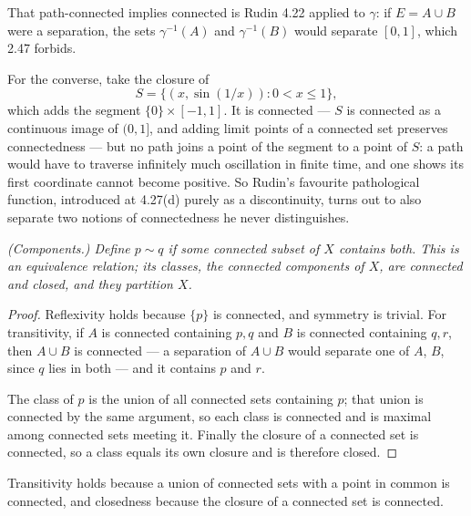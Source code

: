 \begin{deeper}
That path-connected implies connected is Rudin 4.22 applied to $\gamma$:
if $E = A \cup B$ were a separation, the sets $\gamma^{-1}(A)$ and
$\gamma^{-1}(B)$ would separate $[0,1]$, which 2.47 forbids.

For the converse, take the closure of
\[ S = \{(x,\sin(1/x)) : 0 < x \le 1\} , \]
which adds the segment $\{0\}\times[-1,1]$. It is connected --- $S$ is
connected as a continuous image of $(0,1]$, and adding limit points of a
connected set preserves connectedness --- but no path joins a point of the
segment to a point of $S$: a path would have to traverse infinitely much
oscillation in finite time, and one shows its first coordinate cannot become
positive. So Rudin's favourite pathological function, introduced at 4.27(d)
purely as a discontinuity, turns out to also separate two notions of
connectedness he never distinguishes.
\end{deeper}

\emph{(Components.) Define $p \sim q$ if some connected subset of $X$
contains both. This is an equivalence relation; its classes, the
\emph{connected components} of $X$, are connected and closed, and they
partition $X$.}
\begin{proof}
Reflexivity holds because $\{p\}$ is connected, and symmetry is trivial. For
transitivity, if $A$ is connected containing $p,q$ and $B$ is connected
containing $q,r$, then $A \cup B$ is connected --- a separation of $A\cup B$
would separate one of $A$, $B$, since $q$ lies in both --- and it contains
$p$ and $r$.

The class of $p$ is the union of all connected sets containing $p$; that
union is connected by the same argument, so each class is connected and is
maximal among connected sets meeting it. Finally the closure of a connected
set is connected, so a class equals its own closure and is therefore closed.
\end{proof}

\noindent
Transitivity holds because a union of connected sets with a point in common
is connected, and closedness because the closure of a connected set is
connected.

